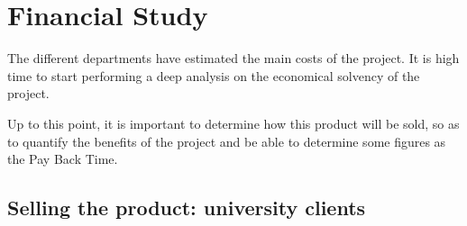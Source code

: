 \chapter{Financial Study}

The different departments have estimated the main costs of the project. It is high time to start performing a deep analysis on the economical solvency of the project. 

Up to this point, it is important to determine how this product will be sold, so as to quantify the benefits of the project and be able to determine some figures as the Pay Back Time. 

\section{Selling the product: university clients}

